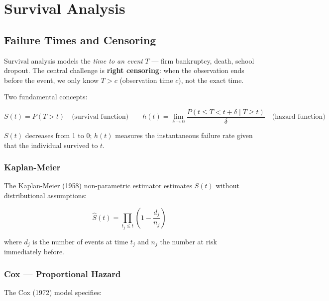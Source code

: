 \chapter{Survival Analysis}
\label{cap:sobrevivencia}

\section{Failure Times and Censoring}

Survival analysis models the \emph{time to an event} $T$ —
firm bankruptcy, death, school dropout. The central challenge is
\textbf{right censoring}: when the observation ends before the event,
we only know $T > c$ (observation time $c$), not the exact time.

Two fundamental concepts:

\[
  S(t) = P(T > t)
  \quad\text{(survival function)}
  \qquad
  h(t) = \lim_{\delta\to 0} \frac{P(t \leq T < t+\delta \mid T \geq t)}{\delta}
  \quad\text{(hazard function)}
\]

$S(t)$ decreases from 1 to 0; $h(t)$ measures the instantaneous failure rate
given that the individual survived to $t$.

\subsection*{Kaplan-Meier}

The Kaplan-Meier (1958) non-parametric estimator estimates $S(t)$ without
distributional assumptions:

\[
  \hat{S}(t) = \prod_{t_j \leq t} \left(1 - \frac{d_j}{n_j}\right)
\]

where $d_j$ is the number of events at time $t_j$ and $n_j$ the number at risk
immediately before.

\subsection*{Cox — Proportional Hazard}

The Cox (1972) model specifies:

